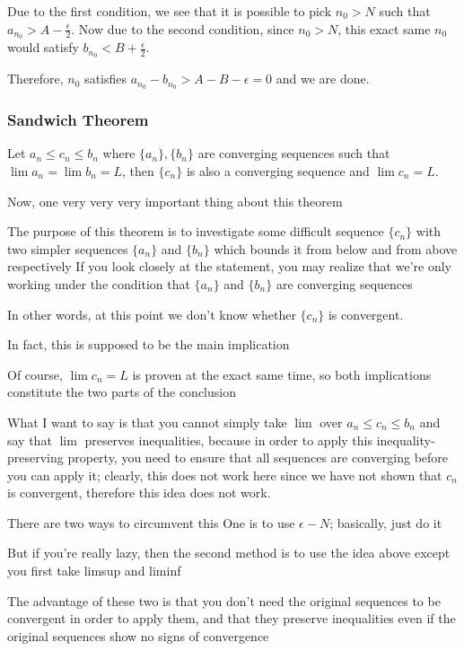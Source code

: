 Due to the first condition, we see that it is possible to pick $n_0>N$ such that $a_{n_0}>A-\frac{\epsilon}{2}$.
Now due to the second condition, since $n_0>N$, this exact same $n_0$ would satisfy $b_{n_0}<B+\frac{\epsilon}{2}$.

Therefore, $n_0$ satisfies $a_{n_0}-b_{n_0}>A-B-\epsilon=0$ and we are done.

\subsubsection{Sandwich Theorem}
\begin{theorem}
Let $a_n\le c_n\le b_n$ where $\{a_n\},\{b_n\}$ are converging sequences such that $\lim a_n=\lim b_n=L$, then $\{c_n\}$ is also a converging sequence and $\lim c_n=L$.
\end{theorem}


Now, one very very very important thing about this theorem

The purpose of this theorem is to investigate some difficult sequence $\{c_n\}$ with two simpler sequences $\{a_n\}$ and $\{b_n\}$ which bounds it from below and from above respectively
If you look closely at the statement, you may realize that we're only working under the condition that $\{a_n\}$ and $\{b_n\}$ are converging sequences

In other words, at this point we don't know whether $\{c_n\}$ is convergent.

In fact, this is supposed to be the main implication

Of course, $\lim c_n=L$ is proven at the exact same time, so both implications constitute the two parts of the conclusion

What I want to say is that you cannot simply take $\lim$ over $a_n\le c_n\le b_n$ and say that $\lim$ preserves inequalities, because in order to apply this inequality-preserving property, you need to ensure that all sequences are converging before you can apply it; clearly, this does not work here since we have not shown that $c_n$ is convergent, therefore this idea does not work.

There are two ways to circumvent this
One is to use $\epsilon-N$; basically, just do it

But if you're really lazy, then the second method is to use the idea above except you first take limsup and liminf

The advantage of these two is that you don't need the original sequences to be convergent in order to apply them, and that they preserve inequalities even if the original sequences show no signs of convergence

